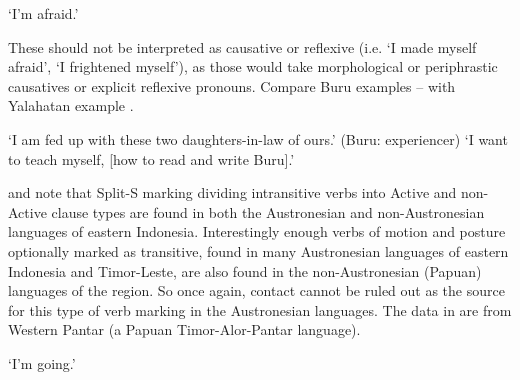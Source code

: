 \begin{exe}
			\glt	‘I'm afraid.’
						\label{ex:07-09}
\end{exe}

These should not be interpreted as causative or reflexive (i.e.
‘I made myself afraid’,
‘I frightened myself’), as those would take morphological or
periphrastic causatives or explicit reflexive pronouns.
Compare Buru examples -- with Yalahatan example .

\begin{exe}
			\glt	‘I am fed up with these two daughters-in-law of ours.’ \hfill{(Buru: experiencer)}
						\label{ex:07-10}
			\glt	‘I want to teach myself, [how to read and write Buru].'
						\label{ex:07-11}
\end{exe}

\citet{Klamer2008} and \citet{Schapper2015} note that Split-S
marking dividing intransitive verbs into Active
and non-Active clause types are found in both the Austronesian
and non-Austronesian languages of eastern Indonesia.
Interestingly enough verbs of motion
and posture optionally marked as transitive,
found in many Austronesian languages of eastern Indonesia
and Timor-Leste, are also found in the non-Austronesian (Papuan)
languages of the region.
So once again, contact cannot be ruled out as the source for
this type of verb marking in the Austronesian languages.
The data in  are from Western Pantar (a Papuan Timor-Alor-Pantar
language).

\begin{exe}
			\glt	‘I'm going.’
						\label{ex:07-12}
\end{exe}

